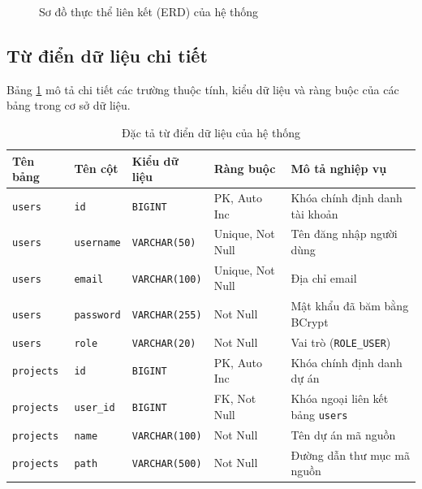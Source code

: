 \documentclass[12pt,a4paper]{report}
\begin{document}
\begin{figure}[H]
\caption{Sơ đồ thực thể liên kết (ERD) của hệ thống}
\label{fig:database_erd}
\end{figure}

\subsection{Từ điển dữ liệu chi tiết}
Bảng \ref{tab:data_dictionary} mô tả chi tiết các trường thuộc tính, kiểu dữ liệu và ràng buộc của các bảng trong cơ sở dữ liệu.

\begin{table}[H]
\centering
\caption{Đặc tả từ điển dữ liệu của hệ thống}
\label{tab:data_dictionary}
\renewcommand{\arraystretch}{1.2}
\begin{tabular}{|p{2.5cm}|p{2.5cm}|p{2.2cm}|p{2.2cm}|p{4.2cm}|}
\hline
\textbf{Tên bảng} & \textbf{Tên cột} & \textbf{Kiểu dữ liệu} & \textbf{Ràng buộc} & \textbf{Mô tả nghiệp vụ} \\ \hline
\texttt{users} & \texttt{id} & \texttt{BIGINT} & PK, Auto Inc & Khóa chính định danh tài khoản \\ \hline
\texttt{users} & \texttt{username} & \texttt{VARCHAR(50)} & Unique, Not Null & Tên đăng nhập người dùng \\ \hline
\texttt{users} & \texttt{email} & \texttt{VARCHAR(100)} & Unique, Not Null & Địa chỉ email \\ \hline
\texttt{users} & \texttt{password} & \texttt{VARCHAR(255)} & Not Null & Mật khẩu đã băm bằng BCrypt \\ \hline
\texttt{users} & \texttt{role} & \texttt{VARCHAR(20)} & Not Null & Vai trò (\texttt{ROLE\_USER}) \\ \hline
\texttt{projects} & \texttt{id} & \texttt{BIGINT} & PK, Auto Inc & Khóa chính định danh dự án \\ \hline
\texttt{projects} & \texttt{user\_id} & \texttt{BIGINT} & FK, Not Null & Khóa ngoại liên kết bảng \texttt{users} \\ \hline
\texttt{projects} & \texttt{name} & \texttt{VARCHAR(100)} & Not Null & Tên dự án mã nguồn \\ \hline
\texttt{projects} & \texttt{path} & \texttt{VARCHAR(500)} & Not Null & Đường dẫn thư mục mã nguồn \\ \hline

\end{tabular}
\end{table}
\end{document}
